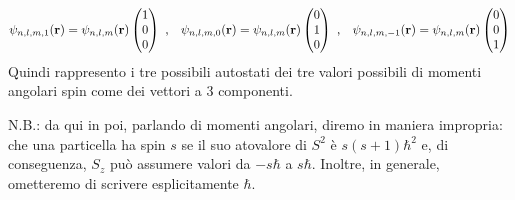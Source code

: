 \begin{equation*}
    \psi_{n,l,m,1}(\mathbf{r})=\psi_{n,l,m}(\mathbf{r})\left(\begin{array}{@{}c@{}}
1 \\
0 \\
0
\end{array}\right) \text{ ,}\quad     \psi_{n,l,m,0}(\mathbf{r})=\psi_{n,l,m}(\mathbf{r})\left(\begin{array}{@{}c@{}}
0 \\
1 \\
0
\end{array}\right) \text{ ,}\quad     \psi_{n,l,m,-1}(\mathbf{r})=\psi_{n,l,m}(\mathbf{r})\left(\begin{array}{@{}c@{}}
0 \\
0 \\
1
\end{array}\right)
\end{equation*}
Quindi rappresento i tre possibili autostati dei tre valori possibili di momenti angolari spin come dei vettori a 3 componenti. 

N.B.: da qui in poi, parlando di momenti angolari, diremo in maniera impropria: che una particella ha spin $s$ se il suo atovalore di $S^2$ è $s(s+1)\hbar^2$ e, di conseguenza, $S_z$ può assumere valori da $-s\hbar$ a $s\hbar$. Inoltre, in generale, ometteremo di scrivere esplicitamente $\hbar$.
